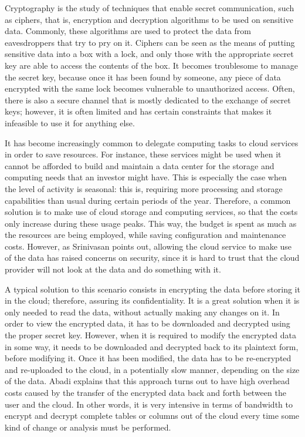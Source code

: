 Cryptography is the study of techniques that enable secret communication, such as ciphers, that is, encryption and decryption algorithms to be used on sensitive data. Commonly, these algorithms are used to protect the data from eavesdroppers that try to pry on it. Ciphers can be seen as the means of putting sensitive data into a box with a lock, and only those with the appropriate secret key are able to access the contents of the box. It becomes troublesome to manage the secret key, because once it has been found by someone, any piece of data encrypted with the same lock becomes vulnerable to unauthorized access. Often, there is also a secure channel that is mostly dedicated to the exchange of secret keys; however, it is often limited and has certain constraints that makes it infeasible to use it for anything else.

It has become increasingly common to delegate computing tasks to cloud services in order to save resources. For instance, these services might be used when it cannot be afforded to build and maintain a data center for the storage and computing needs that an investor might have. This is especially the case when the level of activity is seasonal: this is, requiring more processing and storage capabilities than usual during certain periods of the year. Therefore, a common solution is to make use of cloud storage and computing services, so that the costs only increase during these usage peaks. This way, the budget is spent as much as the resources are being employed, while saving configuration and maintenance costs. However, as Srinivasan \cite{Srinivasan:2012:SCC:2345396.2345474} points out, allowing the cloud service to make use of the data has raised concerns on security, since it is hard to trust that the cloud provider will not look at the data and do something with it.

A typical solution to this scenario consists in encrypting the data before storing it in the cloud; therefore, assuring its confidentiality. It is a great solution when it is only needed to read the data, without actually making any changes on it. In order to view the encrypted data, it has to be downloaded and decrypted using the proper secret key. However, when it is required to modify the encrypted data in some way, it needs to be downloaded and decrypted back to its plaintext form, before modifying it. Once it has been modified, the data has to be re-encrypted and re-uploaded to the cloud, in a potentially slow manner, depending on the size of the data. Abadi \cite{abadi2009data} explains that this approach turns out to have high overhead costs caused by the transfer of the encrypted data back and forth between the user and the cloud. In other words, it is very intensive in terms of bandwidth to encrypt and decrypt complete tables or columns out of the cloud every time some kind of change or analysis must be performed.


